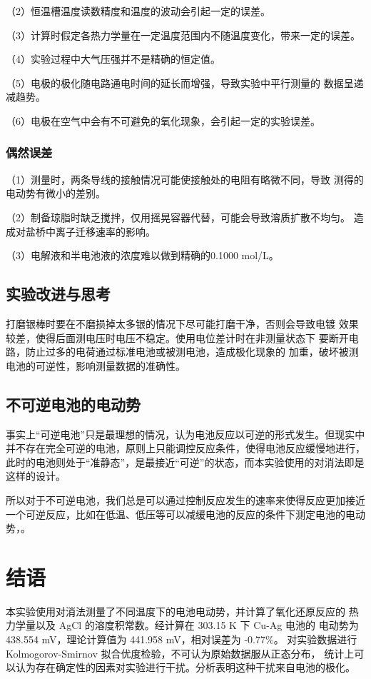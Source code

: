 \documentclass[12pt]{ctexart}
\numberwithin{equation}{section}
\begin{document}
（2）恒温槽温度读数精度和温度的波动会引起一定的误差。

（3）计算时假定各热力学量在一定温度范围内不随温度变化，带来一定的误差。

（4）实验过程中大气压强并不是精确的恒定值。

（5）电极的极化随电路通电时间的延长而增强，导致实验中平行测量的
数据呈递减趋势。

（6）电极在空气中会有不可避免的氧化现象，会引起一定的实验误差。

\subsubsection{偶然误差}
（1）测量时，两条导线的接触情况可能使接触处的电阻有略微不同，导致
测得的电动势有微小的差别。

（2）制备琼脂时缺乏搅拌，仅用摇晃容器代替，可能会导致溶质扩散不均匀。
造成对盐桥中离子迁移速率的影响。

（3）电解液和半电池液的浓度难以做到精确的0.1000 mol/L。

\subsection{实验改进与思考}

打磨银棒时要在不磨损掉太多银的情况下尽可能打磨干净，否则会导致电镀
效果较差，使得后面测电压时电压不稳定。使用电位差计时在非测量状态下
要断开电路，防止过多的电荷通过标准电池或被测电池，造成极化现象的
加重，破坏被测电池的可逆性，影响测量数据的准确性。

\subsection{不可逆电池的电动势}

事实上“可逆电池”只是最理想的情况，认为电池反应以可逆的形式发生。但现实中并不存在完全可逆的电池，原则上只能调控反应条件，使得电池反应缓慢地进行，此时的电池则处于“准静态”，是最接近“可逆”的状态，而本实验使用的对消法即是这样的设计。

所以对于不可逆电池，我们总是可以通过控制反应发生的速率来使得反应更加接近一个可逆反应，比如在低温、低压等可以减缓电池的反应的条件下测定电池的电动势，。



\section{结语}
本实验使用对消法测量了不同温度下的电池电动势，并计算了氧化还原反应的
热力学量以及 AgCl 的溶度积常数。经计算在 303.15 K 下 Cu-Ag 电池的
电动势为 438.554 mV，理论计算值为 441.958 mV，相对误差为 -0.77\%。
对实验数据进行 Kolmogorov-Smirnov 拟合优度检验，不可认为原始数据服从正态分布，
统计上可以认为存在确定性的因素对实验进行干扰。分析表明这种干扰来自电池的极化。
\end{document}
